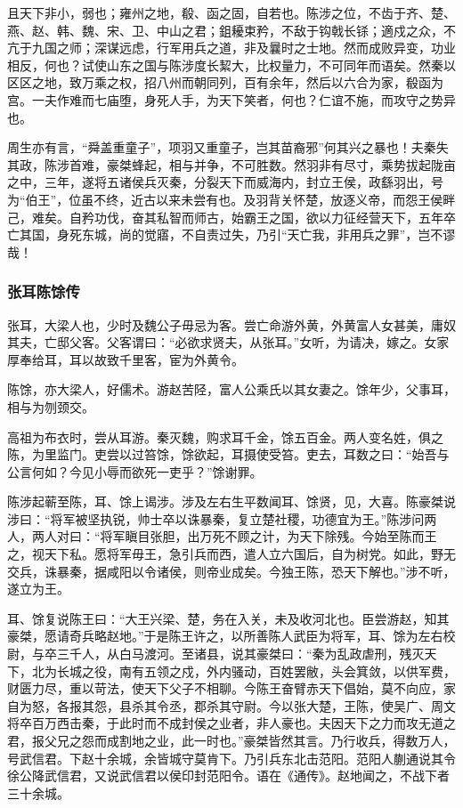 \documentclass[]{article}
\begin{document}
且天下非小，弱也；雍州之地，殽、函之固，自若也。陈涉之位，不齿于齐、楚、燕、赵、韩、魏、宋、卫、中山之君；鉏耰束矜，不敌于钩戟长铩；適戍之众，不亢于九国之师；深谋远虑，行军用兵之道，非及曩时之士地。然而成败异变，功业相反，何也？试使山东之国与陈涉度长絜大，比权量力，不可同年而语矣。然秦以区区之地，致万乘之权，招八州而朝同列，百有余年，然后以六合为家，殽函为宫。一夫作难而七庙堕，身死人手，为天下笑者，何也？仁谊不施，而攻守之势异也。

周生亦有言，``舜盖重童子''，项羽又重童子，岂其苗裔邪''何其兴之暴也！夫秦失其政，陈涉首难，豪桀蜂起，相与并争，不可胜数。然羽非有尽寸，乘势拔起陇亩之中，三年，遂将五诸侯兵灭秦，分裂天下而威海内，封立王侯，政繇羽出，号为``伯王''，位虽不终，近古以来未尝有也。及羽背关怀楚，放逐义帝，而怨王侯畔己，难矣。自矜功伐，奋其私智而师古，始霸王之国，欲以力征经营天下，五年卒亡其国，身死东城，尚的觉寤，不自责过失，乃引``天亡我，非用兵之罪''，岂不谬哉！

\hypertarget{header-n3469}{%
\subsubsection{张耳陈馀传}\label{header-n3469}}

张耳，大梁人也，少时及魏公子毋忌为客。尝亡命游外黄，外黄富人女甚美，庸奴其夫，亡邸父客。父客谓曰：``必欲求贤夫，从张耳。''女听，为请决，嫁之。女家厚奉给耳，耳以故致千里客，宦为外黄令。

陈馀，亦大梁人，好儒术。游赵苦陉，富人公乘氏以其女妻之。馀年少，父事耳，相与为刎颈交。

高祖为布衣时，尝从耳游。秦灭魏，购求耳千金，馀五百金。两人变名姓，俱之陈，为里监门。吏尝以过笞馀，馀欲起，耳摄使受笞。吏去，耳数之曰：``始吾与公言何如？今见小辱而欲死一吏乎？''馀谢罪。

陈涉起蕲至陈，耳、馀上谒涉。涉及左右生平数闻耳、馀贤，见，大喜。陈豪桀说涉曰：``将军被坚执锐，帅士卒以诛暴秦，复立楚社稷，功德宜为王。''陈涉问两人，两人对曰：``将军瞋目张胆，出万死不顾之计，为天下除残。今始至陈而王之，视天下私。愿将军毋王，急引兵而西，遣人立六国后，自为树党。如此，野无交兵，诛暴秦，据咸阳以令诸侯，则帝业成矣。今独王陈，恐天下解也。''涉不听，遂立为王。

耳、馀复说陈王曰：``大王兴梁、楚，务在入关，未及收河北也。臣尝游赵，知其豪桀，愿请奇兵略赵地。''于是陈王许之，以所善陈人武臣为将军，耳、馀为左右校尉，与卒三千人，从白马渡河。至诸县，说其豪桀曰：``秦为乱政虐刑，残灭天下，北为长城之役，南有五领之戍，外内骚动，百姓罢敝，头会箕敛，以供军费，财匮力尽，重以苛法，使天下父子不相聊。今陈王奋臂赤天下倡始，莫不向应，家自为怒，各报其怨，县杀其令丞，郡杀其守尉。今以张大楚，王陈，使吴广、周文将卒百万西击秦，于此时而不成封侯之业者，非人豪也。夫因天下之力而攻无道之君，报父兄之怨而成割地之业，此一时也。''豪桀皆然其言。乃行收兵，得数万人，号武信君。下赵十余城，余皆城守莫肯下。乃引兵东北击范阳。范阳人蒯通说其令徐公降武信君，又说武信君以侯印封范阳令。语在《通传》。赵地闻之，不战下者三十余城。
\end{document}
